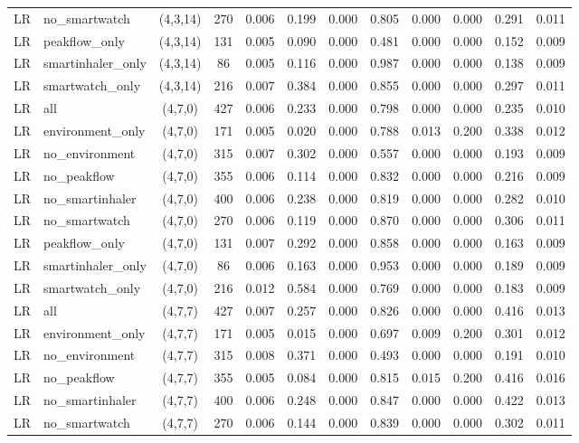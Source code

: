 \begin{longtable}{llcccccccccc}
LR & no\_smartwatch & (4,3,14) & 270 & 0.006 & 0.199 & 0.000 & 0.805 & 0.000 & 0.000 & 0.291 & 0.011 \\
LR & peakflow\_only & (4,3,14) & 131 & 0.005 & 0.090 & 0.000 & 0.481 & 0.000 & 0.000 & 0.152 & 0.009 \\
LR & smartinhaler\_only & (4,3,14) & 86 & 0.005 & 0.116 & 0.000 & 0.987 & 0.000 & 0.000 & 0.138 & 0.009 \\
LR & smartwatch\_only & (4,3,14) & 216 & 0.007 & 0.384 & 0.000 & 0.855 & 0.000 & 0.000 & 0.297 & 0.011 \\
LR & all & (4,7,0) & 427 & 0.006 & 0.233 & 0.000 & 0.798 & 0.000 & 0.000 & 0.235 & 0.010 \\
LR & environment\_only & (4,7,0) & 171 & 0.005 & 0.020 & 0.000 & 0.788 & 0.013 & 0.200 & 0.338 & 0.012 \\
LR & no\_environment & (4,7,0) & 315 & 0.007 & 0.302 & 0.000 & 0.557 & 0.000 & 0.000 & 0.193 & 0.009 \\
LR & no\_peakflow & (4,7,0) & 355 & 0.006 & 0.114 & 0.000 & 0.832 & 0.000 & 0.000 & 0.216 & 0.009 \\
LR & no\_smartinhaler & (4,7,0) & 400 & 0.006 & 0.238 & 0.000 & 0.819 & 0.000 & 0.000 & 0.282 & 0.010 \\
LR & no\_smartwatch & (4,7,0) & 270 & 0.006 & 0.119 & 0.000 & 0.870 & 0.000 & 0.000 & 0.306 & 0.011 \\
LR & peakflow\_only & (4,7,0) & 131 & 0.007 & 0.292 & 0.000 & 0.858 & 0.000 & 0.000 & 0.163 & 0.009 \\
LR & smartinhaler\_only & (4,7,0) & 86 & 0.006 & 0.163 & 0.000 & 0.953 & 0.000 & 0.000 & 0.189 & 0.009 \\
LR & smartwatch\_only & (4,7,0) & 216 & 0.012 & 0.584 & 0.000 & 0.769 & 0.000 & 0.000 & 0.183 & 0.009 \\
LR & all & (4,7,7) & 427 & 0.007 & 0.257 & 0.000 & 0.826 & 0.000 & 0.000 & 0.416 & 0.013 \\
LR & environment\_only & (4,7,7) & 171 & 0.005 & 0.015 & 0.000 & 0.697 & 0.009 & 0.200 & 0.301 & 0.012 \\
LR & no\_environment & (4,7,7) & 315 & 0.008 & 0.371 & 0.000 & 0.493 & 0.000 & 0.000 & 0.191 & 0.010 \\
LR & no\_peakflow & (4,7,7) & 355 & 0.005 & 0.084 & 0.000 & 0.815 & 0.015 & 0.200 & 0.416 & 0.016 \\
LR & no\_smartinhaler & (4,7,7) & 400 & 0.006 & 0.248 & 0.000 & 0.847 & 0.000 & 0.000 & 0.422 & 0.013 \\
LR & no\_smartwatch & (4,7,7) & 270 & 0.006 & 0.144 & 0.000 & 0.839 & 0.000 & 0.000 & 0.302 & 0.011 \\

\end{longtable}
